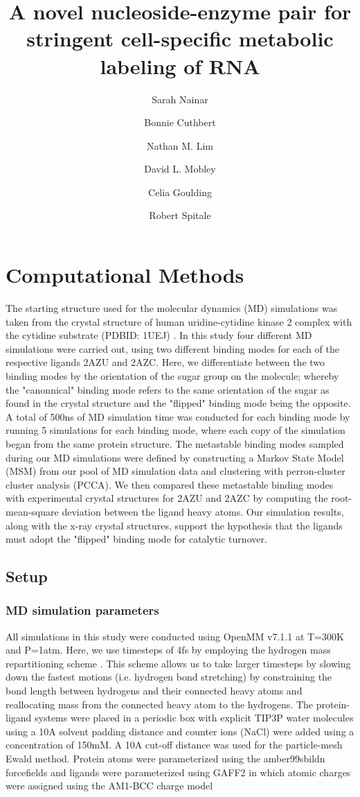 \documentclass[fleqn,10pt]{wlscirep}
\title{A novel nucleoside-enzyme pair for stringent cell-specific metabolic labeling of RNA}
\author[1]{Sarah Nainar}
\author[1]{Bonnie Cuthbert}
\author[1]{Nathan M. Lim}
\author[1]{David L. Mobley}
\author[1]{Celia Goulding}
\author[1, *]{Robert Spitale}
\affil[1]{Department of Pharmaceutical Sciences, University of California---Irvine, Irvine, California 92697, United States}
\affil[*]{rspitale@uci.edu}
\begin{document}
\flushbottom
\maketitle
\tableofcontents

\section{Computational Methods}
The starting structure used for the molecular dynamics (MD) simulations was taken from the crystal structure of human uridine-cytidine kinase 2 complex with the cytidine substrate (PDBID: 1UEJ) \cite{suzuki2004structural}.
In this study four different MD simulations were carried out, using two different binding modes for each of the respective ligands 2AZU and 2AZC.
Here, we differentiate between the two binding modes by the orientation of the sugar group on the molecule; whereby the "canonnical" binding mode refers to the same orientation of the sugar as found in the crystal structure and the "flipped" binding mode being the opposite.
A total of 500ns of MD simulation time was conducted for each binding mode by running 5 simulations for each binding mode, where each copy of the simulation began from the same protein structure.
The metastable binding modes sampled during our MD simulations were defined by constructing a Markov State Model (MSM) from our pool of MD simulation data and clustering with perron-cluster cluster analysis (PCCA).
We then compared these metastable binding modes with experimental crystal structures for 2AZU and 2AZC by computing the root-mean-square deviation between the ligand heavy atoms.
Our simulation results, along with the x-ray crystal structures, support the hypothesis that the ligands must adopt the "flipped" binding mode for catalytic turnover. 

\subsection{Setup}
\subsubsection{MD simulation parameters}
All simulations in this study were conducted using OpenMM v7.1.1 \cite{openmm} at T=300K and P=1atm.
Here, we use timesteps of 4fs by employing the hydrogen mass repartitioning scheme \cite{hmr}. 
This scheme allows us to take larger timesteps by slowing down the fastest motions (i.e. hydrogen bond stretching) by constraining the bond length between hydrogens and their connected heavy atoms and reallocating mass from the connected heavy atom to the hydrogens.
The protein-ligand systems were placed in a periodic box with explicit TIP3P water molecules using a 10A solvent padding distance and counter ions (NaCl) were added using a concentration of 150mM.
A 10A cut-off distance was used for the particle-mesh Ewald method.
Protein atoms were parameterized using the amber99sbildn forcefields \cite{amber99sbildn} and ligands were parameterized using GAFF2 \cite{ambergaff} in which atomic charges were assigned using the AM1-BCC charge model \cite{am1bcc}
\end{document}
